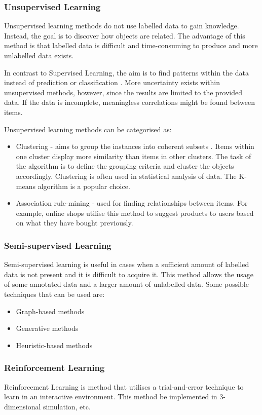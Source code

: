\documentclass[12pt,a4paper]{article}
\begin{document}
\subsubsection{Unsupervised Learning}
Unsupervised learning methods do not use labelled data to gain knowledge. Instead, the goal is to discover how objects are related. The advantage of this method is that labelled data is difficult and time-consuming to produce and more unlabelled data exists.

In contrast to Supervised Learning, the aim is to find patterns within the data instead of prediction or classification \citep{Kononenko2007}. More uncertainty exists within unsupervised methods, however, since the results are limited to the provided data. If the data is incomplete, meaningless correlations might be found between items.

Unsupervised learning methods can be categorised as:
\begin{itemize}
	\item Clustering - aims to group the instances into coherent subsets \citep{Kononenko2007}. Items within one cluster display more similarity than items in other clusters. The task of the algorithm is to define the grouping criteria and cluster the objects accordingly. Clustering is often used in statistical analysis of data. The K-means algorithm is a popular choice.
	\item Association rule-mining - used for finding relationships between items. For example, online shops utilise this method to suggest products to users based on what they have bought previously. 
\end{itemize}

\subsubsection{Semi-supervised Learning}
Semi-supervised learning is useful in cases when a sufficient amount of labelled data is not present and it is difficult to acquire it. This method allows the usage of some annotated data and a larger amount of unlabelled data. Some possible techniques that can be used are:
\begin{itemize}
	\item Graph-based methods
	\item Generative methods
	\item Heuristic-based methods
\end{itemize}

\subsubsection{Reinforcement Learning}
Reinforcement Learning is method that utilises a trial-and-error technique to learn in an interactive environment. This method be implemented in 3-dimensional simulation, etc.
\end{document}
